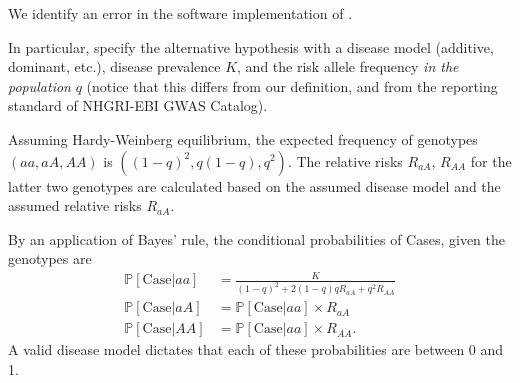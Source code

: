 We identify an error in the software implementation of \citet{Johnson17}.

In particular, \citet{Johnson17} specify the alternative hypothesis with a disease model (additive, dominant, etc.), disease prevalence $K$, and the risk allele frequency \emph{in the population} $q$ (notice that this differs from our definition, and from the reporting standard of NHGRI-EBI GWAS Catalog). 

Assuming Hardy-Weinberg equilibrium, the expected frequency of genotypes $(aa, aA, AA)$ is $((1-q)^2, q(1-q), q^2)$.
The relative risks $R_{aA}$, $R_{AA}$ for the latter two genotypes are calculated based on the assumed disease model and the assumed relative risks $R_{aA}$.

By an application of Bayes' rule, the conditional probabilities of Cases, given the genotypes are
\begin{align}
    \mathbb P[\mathrm{Case}|aa] &= \frac{K}{(1-q)^2 + 2(1-q)qR_{aA} + q^2R_{AA}} \\
    \mathbb P[\mathrm{Case}|aA] &= \mathbb P[\mathrm{Case}|aa] \times R_{aA} \\
    \mathbb P[\mathrm{Case}|AA] &= \mathbb P[\mathrm{Case}|aa] \times R_{AA}.
\end{align}
A valid disease model dictates that each of these probabilities are between 0 and 1.
